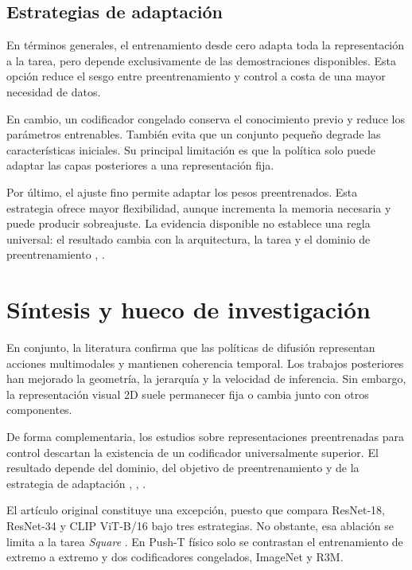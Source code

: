\subsection{Estrategias de adaptaci\'on}
\label{subsec:estrategias-adaptacion}

En t\'erminos generales, el entrenamiento desde cero adapta toda la representaci\'on a
la tarea, pero depende exclusivamente de las demostraciones disponibles. Esta opci\'on
reduce el sesgo entre preentrenamiento y control a costa de una mayor necesidad de
datos.

En cambio, un codificador congelado conserva el conocimiento previo y reduce los
par\'ametros entrenables. Tambi\'en evita que un conjunto peque\~no degrade las
caracter\'isticas iniciales. Su principal limitaci\'on es que la pol\'itica solo puede
adaptar las capas posteriores a una representaci\'on fija.

Por \'ultimo, el ajuste fino permite adaptar los pesos preentrenados. Esta estrategia
ofrece mayor flexibilidad, aunque incrementa la memoria necesaria y puede producir
sobreajuste. La evidencia disponible no establece una regla universal: el resultado
cambia con la arquitectura, la tarea y el dominio de preentrenamiento
\cite{chi2025diffusion}, \cite{egbe2025dinov3dp}.

\section{S\'intesis y hueco de investigaci\'on}
\label{sec:hueco}

En conjunto, la literatura confirma que las pol\'iticas de difusi\'on representan
acciones multimodales y mantienen coherencia temporal. Los trabajos posteriores han
mejorado la geometr\'ia, la jerarqu\'ia y la velocidad de inferencia. Sin embargo, la
representaci\'on visual 2D suele permanecer fija o cambia junto con otros componentes.

De forma complementaria, los estudios sobre representaciones preentrenadas para
control descartan la existencia de un codificador universalmente superior. El
resultado depende del dominio, del objetivo de preentrenamiento y de la estrategia
de adaptaci\'on \cite{xiao2022mvp}, \cite{karamcheti2023voltron},
\cite{majumdar2023vc1}.

El art\'iculo original constituye una excepci\'on, puesto que compara ResNet-18,
ResNet-34 y CLIP ViT-B/16 bajo tres estrategias. No obstante, esa ablaci\'on se limita
a la tarea \textit{Square} \cite{chi2025diffusion}. En Push-T f\'isico solo se
contrastan el entrenamiento de extremo a extremo y dos codificadores congelados,
ImageNet y R3M.

